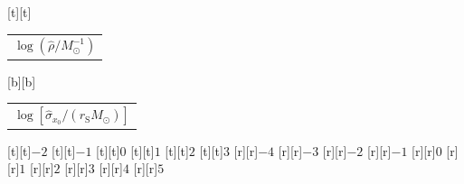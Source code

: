 %    
%
%
\begin{psfrags}%
\psfragscanon%
%
[t][t]{\color[rgb]{0,0,0}\setlength{\tabcolsep}{0pt}\begin{tabular}{c}{\Large$\log\left(\hat{\rho}/M_\odot^{-1}\right)$}\end{tabular}}%
[b][b]{\color[rgb]{0,0,0}\setlength{\tabcolsep}{0pt}\begin{tabular}{c}{\Large$\log\left[\hat{\sigma}_{x_0}/\left(r_\mathrm{S} M_\odot\right)\right]$}\end{tabular}}%
%
[t][t]{$-2$}%
[t][t]{$-1$}%
[t][t]{$0$}%
[t][t]{$1$}%
[t][t]{$2$}%
[t][t]{$3$}%
%
[r][r]{$-4$}%
[r][r]{$-3$}%
[r][r]{$-2$}%
[r][r]{$-1$}%
[r][r]{$0$}%
[r][r]{$1$}%
[r][r]{$2$}%
[r][r]{$3$}%
[r][r]{$4$}%
[r][r]{$5$}%
%
%
\end{psfrags}%
%
